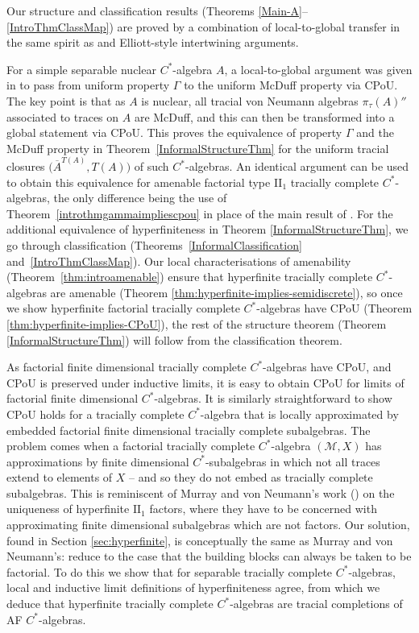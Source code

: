 \documentclass[a4paper,11pt]{amsart}
\theoremstyle{definition}
\numberwithin{equation}{section}
\numberwithin{theorem}{section}
\newcommand{\M}{\mathcal{M}}
\newcommand{\completion}[2]{\overline{#1}^{#2}}
\begin{document}
Our structure and classification results (Theorems \ref{Main-A}--\ref{IntroThmClassMap}) are proved by a combination of local-to-global transfer in the same spirit as \cite{CETWW,CETW,CETW-classification} and Elliott-style intertwining arguments.  

For a simple separable nuclear $C^*$-algebra $A$, a local-to-global argument was given in \cite[Theorem~4.6]{CETW} to pass from uniform property $\Gamma$ to the uniform McDuff property via CPoU. The key point is that as $A$ is nuclear, all tracial von Neumann algebras $\pi_\tau(A)''$ associated to traces on $A$ are McDuff, and this can then be transformed into a global statement via CPoU.  This proves the equivalence of property $\Gamma$ and the McDuff property in Theorem~\ref{InformalStructureThm} for the uniform tracial closures $\big(\completion{A}{T(A)},T(A)\big)$ of such $C^*$-algebras. An identical argument can be used to obtain this equivalence for {}amenable factorial type II$_1$ tracially complete $C^*$-algebras, the only difference being the use of Theorem~\ref{introthmgammaimpliescpou} in place of the main result of \cite{CETWW}.  For the additional equivalence of hyperfiniteness in Theorem \ref{InformalStructureThm}, we go through classification (Theorems~\ref{InformalClassification} and~\ref{IntroThmClassMap}). Our local characterisations of amenability (Theorem~\ref{thm:introamenable}) ensure that hyperfinite tracially complete $C^*$-algebras are {}amenable (Theorem \ref{thm:hyperfinite-implies-semidiscrete}), so once we show hyperfinite factorial tracially complete $C^*$-algebras have CPoU (Theorem \ref{thm:hyperfinite-implies-CPoU}), the rest of the structure theorem (Theorem \ref{InformalStructureThm}) will follow from the classification theorem.  

As factorial finite dimensional tracially complete $C^*$-algebras have CPoU, and CPoU is preserved under inductive limits, it is easy to obtain CPoU for limits of factorial finite dimensional $C^*$-algebras.
It is similarly straightforward to show CPoU holds for a tracially complete $C^*$-algebra that is locally approximated by embedded factorial finite dimensional tracially complete subalgebras.
The problem comes when a factorial tracially complete $C^*$-algebra $(\M,X)$ has approximations by finite dimensional $C^*$-subalgebras in which not all traces extend to elements of $X$ -- and so they do not embed as tracially complete subalgebras. This is reminiscent of Murray and von Neumann's work (\cite{MvN43}) on the uniqueness of hyperfinite $\mathrm{II}_1$ factors, where they have to be concerned with approximating finite dimensional subalgebras which are not factors.  Our solution, found in Section \ref{sec:hyperfinite}, is conceptually the same as Murray and von Neumann's: reduce to the case that the building blocks can always be taken to be factorial.  To do this we show that for separable tracially complete $C^*$-algebras, local and inductive limit definitions of hyperfiniteness agree, from which we deduce that hyperfinite tracially complete $C^*$-algebras are tracial completions of AF $C^*$-algebras.
\end{document}
